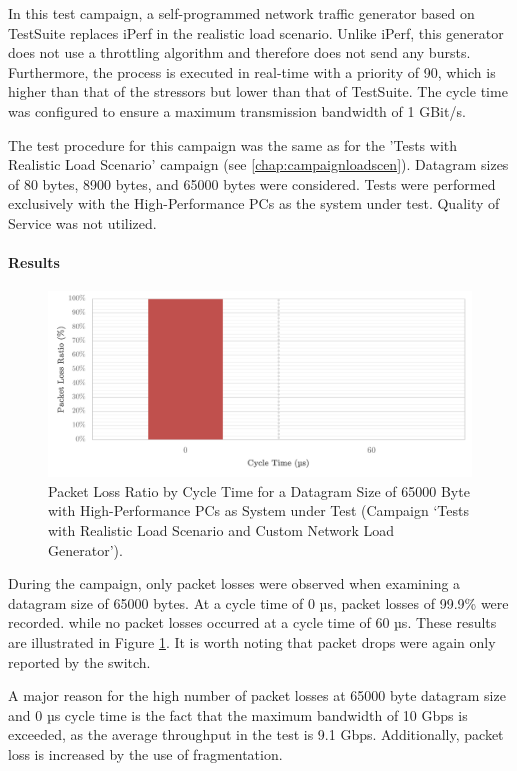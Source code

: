 In this test campaign, a self-programmed network traffic generator based on TestSuite replaces iPerf in the realistic load scenario. Unlike iPerf, this generator does not use a throttling algorithm and therefore does not send any bursts. Furthermore, the process is executed in real-time with a priority of 90, which is higher than that of the stressors but lower than that of TestSuite. The cycle time was configured to ensure a maximum transmission bandwidth of 1 GBit/s.

The test procedure for this campaign was the same as for the 'Tests with Realistic Load Scenario' campaign (see \ref{chap:campaignloadscen}). Datagram sizes of 80 bytes, 8900 bytes, and 65000 bytes were considered. Tests were performed exclusively with the High-Performance PCs as the system under test. Quality of Service was not utilized.

\paragraph{Results}

\begin{figure}[h!]
    \centering
    \includegraphics[width=1\linewidth]{figures/reliability/star/rel_d_5.pdf}
    \caption{Packet Loss Ratio by Cycle Time for a Datagram Size of 65000 Byte with High-Performance PCs as System under Test (Campaign `Tests with Realistic Load Scenario and Custom Network Load Generator').}    \label{fig:srpr5}
\end{figure}

During the campaign, only packet losses were observed when examining a datagram size of 65000 bytes. At a cycle time of 0 µs, packet losses of 99.9\% were recorded. while no packet losses occurred at a cycle time of 60 µs. These results are illustrated in Figure \ref{fig:srpr5}. It is worth noting that packet drops were again only reported by the switch.

A major reason for the high number of packet losses at 65000 byte datagram size and 0 µs cycle time is the fact that the maximum bandwidth of 10 Gbps is exceeded, as the average throughput in the test is 9.1 Gbps. Additionally, packet loss is increased by the use of fragmentation.

